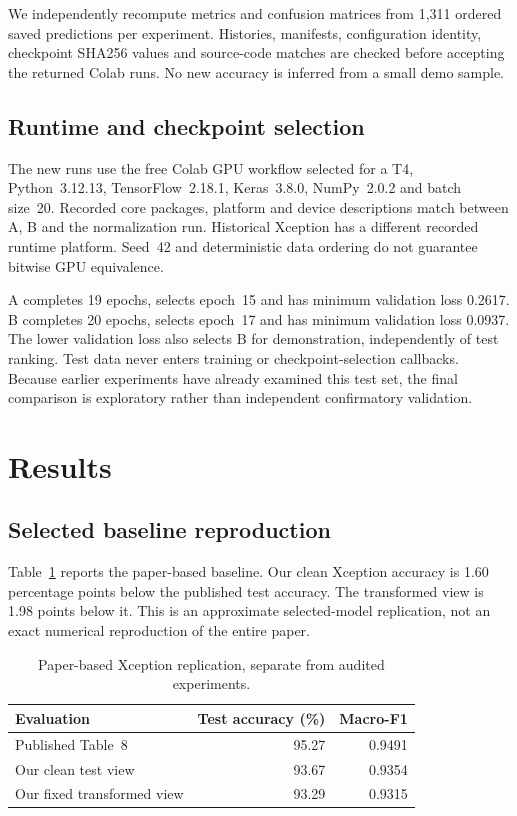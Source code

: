 \documentclass[11pt,a4paper]{article}
\begin{document}
We independently recompute metrics and confusion matrices from 1,311 ordered
saved predictions per experiment. Histories, manifests, configuration identity,
checkpoint SHA256 values and source-code matches are checked before accepting
the returned Colab runs. No new accuracy is inferred from a small demo sample.

\subsection{Runtime and checkpoint selection}
The new runs use the free Colab GPU workflow selected for a T4, Python~3.12.13,
TensorFlow~2.18.1, Keras~3.8.0, NumPy~2.0.2 and batch size~20. Recorded core
packages, platform and device descriptions match between A, B and the
normalization run. Historical Xception has a different recorded runtime
platform. Seed~42 and deterministic data ordering do not guarantee bitwise GPU
equivalence.

A completes 19 epochs, selects epoch~15 and has minimum validation loss 0.2617.
B completes 20 epochs, selects epoch~17 and has minimum validation loss 0.0937.
The lower validation loss also selects B for demonstration, independently of
test ranking. Test data never enters training or checkpoint-selection callbacks.
Because earlier experiments have already examined this test set, the final
comparison is exploratory rather than independent confirmatory validation.

\section{Results}
\subsection{Selected baseline reproduction}
Table~\ref{tab:replication} reports the paper-based baseline. Our clean Xception
accuracy is 1.60 percentage points below the published test accuracy. The
transformed view is 1.98 points below it. This is an approximate selected-model
replication, not an exact numerical reproduction of the entire paper.

\begin{table}[tb]
\centering
\caption{Paper-based Xception replication, separate from audited experiments.}
\label{tab:replication}
\begin{tabular}{lrr}
\toprule
Evaluation & Test accuracy (\%) & Macro-F1\\
\midrule
Published Table~8~\cite{disci2025} & 95.27 & 0.9491\\
Our clean test view & 93.67 & 0.9354\\
Our fixed transformed view & 93.29 & 0.9315\\
\bottomrule
\end{tabular}
\end{table}
\end{document}
